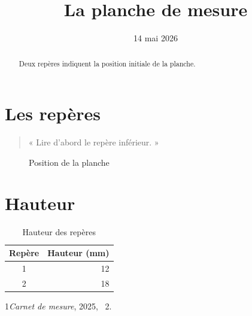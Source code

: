\documentclass{article}
\begin{document}
\title{La planche de mesure}\author{}\date{14 mai 2026}\maketitle
\begin{abstract}Deux repères indiquent la position initiale de la planche.\end{abstract}
\tableofcontents
\section{Les repères}\begin{quote}« Lire d’abord le repère inférieur. »\end{quote}
\begin{figure}[ht]\centering\fbox{\rule{0pt}{8mm}\rule{33mm}{0pt}}\caption{Position de la planche}\end{figure}
\section{Hauteur}
\begin{table}[ht]\centering\begin{tabular}{cr}Repère&Hauteur (mm)\\\hline 1&12\\2&18\end{tabular}\caption{Hauteur des repères}\end{table}
\begin{thebibliography}{1}\emph{Carnet de mesure}, 2025, \chaptername~2.\end{thebibliography}
\end{document}
